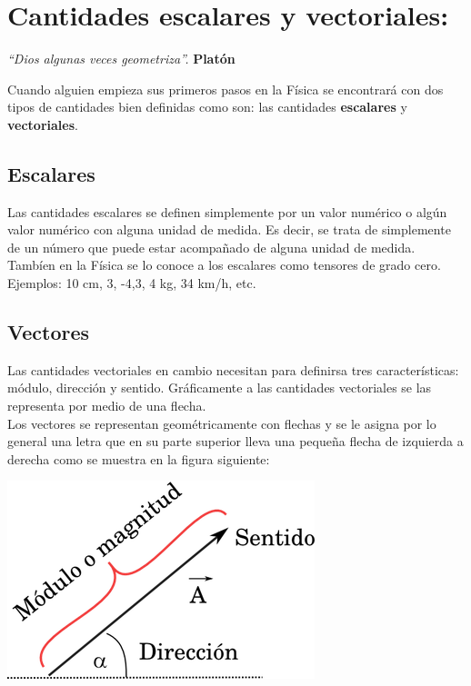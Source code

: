 \documentclass[a5paper,pagesize,10pt,bibtotoc,pointlessnumbers,
normalheadings,DIV=9,fleqn,x11names,table,twoside=false]{scrbook}
\begin{document}
\chapter{Cantidades escalares y vectoriales:}

\textit{``Dios algunas veces geometriza''.} \textbf{Platón} 
\vspace{1.00cm}

Cuando alguien empieza sus primeros pasos en la Física se encontrará con dos tipos de cantidades bien definidas como son: las 
cantidades \textbf{escalares} y \textbf{vectoriales}.\\

\section{Escalares}

Las cantidades escalares se definen simplemente por un valor numérico o algún valor numérico con alguna unidad de 
medida. Es decir, se trata de simplemente de un número que puede estar acompañado de alguna unidad de medida. Tambíen 
en la Física se lo conoce a los escalares como tensores de grado cero. Ejemplos: 10 cm, 3, -4,3, 4 kg, 34 km/h, etc.

\section{Vectores}

Las cantidades vectoriales en cambio necesitan para definirsa tres características: módulo, dirección y sentido. 
Gráficamente a las cantidades vectoriales se las representa por medio de una flecha.\\

Los vectores se representan geométricamente con flechas y se le asigna por lo general una letra que en su parte 
superior lleva una pequeña flecha de izquierda a derecha como se muestra en la figura siguiente:  

\begin{center}
 \includegraphics[scale = 0.4]{images/vector.png}
\end{center}
\end{document}
